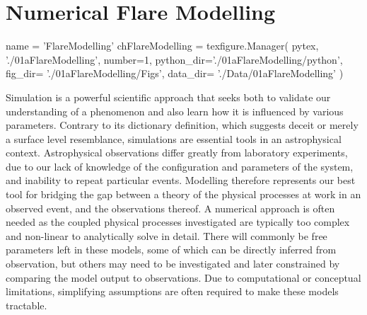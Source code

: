 \chapter{Numerical Flare Modelling}\label{Chap:FlareModelling}
\begin{pycode}[FlareModelling]
name = 'FlareModelling'
chFlareModelling = texfigure.Manager(
    pytex,
    './01aFlareModelling',
    number=1,
    python_dir='./01aFlareModelling/python',
    fig_dir=   './01aFlareModelling/Figs',
    data_dir=  './Data/01aFlareModelling'
)
\end{pycode}


Simulation is a powerful scientific approach that seeks both to validate our understanding of a phenomenon and also learn how it is influenced by various parameters.
Contrary to its dictionary definition, which suggests deceit or merely a surface level resemblance, simulations are essential tools in an astrophysical context.
Astrophysical observations differ greatly from laboratory experiments, due to our lack of knowledge of the configuration and parameters of the system, and inability to repeat particular events.
Modelling therefore represents our best tool for bridging the gap between a theory of the physical processes at work in an observed event, and the observations thereof.
A numerical approach is often needed as the coupled physical processes investigated are typically too complex and non-linear to analytically solve in detail.
There will commonly be free parameters left in these models, some of which can be directly inferred from observation, but others may need to be investigated and later constrained by comparing the model output to observations.
Due to computational or conceptual limitations, simplifying assumptions are often required to make these models tractable.




